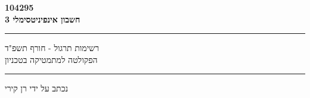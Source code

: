 \begin{titlepage}
    \begin{center}
    	\color{white} %
        \vspace*{5cm} %
		\Large \textbf{104295}        \\
		\vspace{0.5cm}
        \Huge \textbf{חשבון אינפיניטסימלי 3}
        \vspace{0.5cm}
        \rule{\linewidth}{0.5mm}
        \vspace{1cm}
        \Large רשימות תרגול - חורף תשפ"ד \\
        \vspace{0.5cm}
        \normalsize הפקולטה למתמטיקה בטכניון
        \vspace{0.5cm}
        \rule{\linewidth}{0.5mm}
        \vfill
        \normalsize נכתב על ידי רן קירי
    \end{center}
\end{titlepage}
